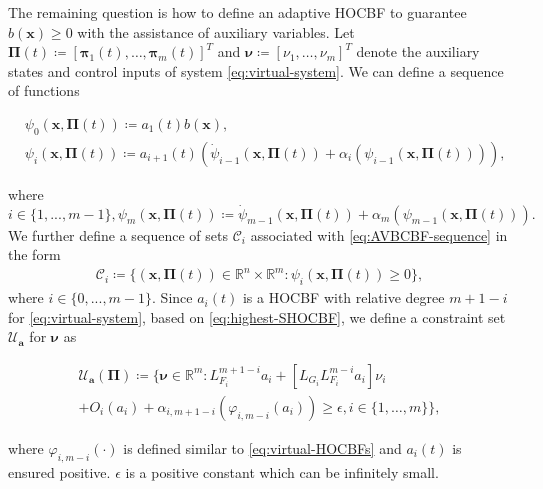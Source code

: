 The remaining question is how to define an adaptive HOCBF to guarantee $b(\boldsymbol{x})\ge0$ with the assistance of auxiliary variables. Let $\boldsymbol{\Pi}(t)\coloneqq [\boldsymbol{\pi}_{1}(t),\dots,\boldsymbol{\pi}_{m}(t)]^{T}$ and $\boldsymbol{\nu}\coloneqq [\nu_{1},\dots,\nu_{m}]^{T}$ denote the auxiliary states and control inputs of system \eqref{eq:virtual-system}. We can define a sequence of functions 
\begin{small}
\begin{equation}
\label{eq:AVBCBF-sequence}
\begin{split}
&\psi_{0}(\boldsymbol{x},\boldsymbol{\Pi}(t))\coloneqq a_{1}(t)b(\boldsymbol{x}),\\
&\psi_{i}(\boldsymbol{x},\boldsymbol{\Pi}(t))\coloneqq a_{i+1}(t)(\dot{\psi}_{i-1}(\boldsymbol{x},\boldsymbol{\Pi}(t))+\alpha_{i}(\psi_{i-1}(\boldsymbol{x},\boldsymbol{\Pi}(t)))),
\end{split}
\end{equation}
\end{small}
where $i \in \{1,...,m-1\}, \psi_{m}(\boldsymbol{x},\boldsymbol{\Pi}(t))\coloneqq \dot{\psi}_{m-1}(\boldsymbol{x},\boldsymbol{\Pi}(t))+\alpha_{m}(\psi_{m-1}(\boldsymbol{x},\boldsymbol{\Pi}(t))).$ We further define a sequence of sets $\mathcal{C}_{i}$ associated with \eqref{eq:AVBCBF-sequence} in the form 
\begin{equation}
\label{eq:AVBCBF-set}
\begin{split}
\mathcal C_{i}\coloneqq \{(\boldsymbol{x},\boldsymbol{\Pi}(t)) \in \mathbb{R}^{n} \times \mathbb{R}^{m}:\psi_{i}(\boldsymbol{x},\boldsymbol{\Pi}(t))\ge 0\}, 
\end{split}
\end{equation}
where $i \in \{0,...,m-1\}.$
Since $a_{i}(t)$ is a HOCBF with relative degree $m+1-i$ for \eqref{eq:virtual-system}, based on \eqref{eq:highest-SHOCBF}, we define a constraint set $\mathcal{U}_{\boldsymbol{a}}$ for $\boldsymbol{\nu}$ as 
\begin{small}
\begin{equation}
\label{eq:constraint-up}
\begin{split}
\mathcal{U}_{\boldsymbol{a}}(\boldsymbol{\Pi})\coloneqq \{\boldsymbol{\nu}\in\mathbb{R}^{m}:   L_{F_{i}}^{m+1-i}a_{i}+[L_{G_{i}}L_{F_{i}}^{m-i}a_{i}]\nu_{i}\\
+O_{i}(a_{i})+ \alpha_{i,m+1-i}(\varphi_{i,m-i}(a_{i})) \ge \epsilon, i\in \{1,\dots,m\}\},
\end{split}
\end{equation}
\end{small}
where $\varphi_{i,m-i}(\cdot)$ is defined similar to \eqref{eq:virtual-HOCBFs} and $a_{i}(t)$ is ensured positive. $\epsilon$ is a positive constant which can be infinitely small. 

